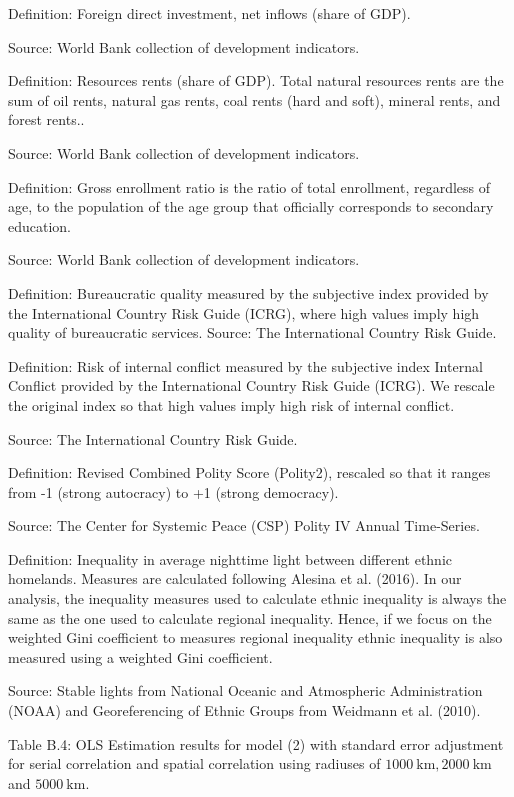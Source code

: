 \documentclass[10pt]{article}
\begin{document}
Definition: Foreign direct investment, net inflows (share of GDP).

Source: World Bank collection of development indicators.

Definition: Resources rents (share of GDP). Total natural resources rents are the sum of oil rents, natural gas rents, coal rents (hard and soft), mineral rents, and forest rents..

Source: World Bank collection of development indicators.

Definition: Gross enrollment ratio is the ratio of total enrollment, regardless of age, to the population of the age group that officially corresponds to secondary education.

Source: World Bank collection of development indicators.

Definition: Bureaucratic quality measured by the subjective index provided by the International Country Risk Guide (ICRG), where high values imply high quality of bureaucratic services. Source: The International Country Risk Guide.

Definition: Risk of internal conflict measured by the subjective index Internal Conflict provided by the International Country Risk Guide (ICRG). We rescale the original index so that high values imply high risk of internal conflict.

Source: The International Country Risk Guide.

Definition: Revised Combined Polity Score (Polity2), rescaled so that it ranges from -1 (strong autocracy) to +1 (strong democracy).

Source: The Center for Systemic Peace (CSP) Polity IV Annual Time-Series.

Definition: Inequality in average nighttime light between different ethnic homelands. Measures are calculated following Alesina et al. (2016). In our analysis, the inequality measures used to calculate ethnic inequality is always the same as the one used to calculate regional inequality. Hence, if we focus on the weighted Gini coefficient to measures regional inequality ethnic inequality is also measured using a weighted Gini coefficient.

Source: Stable lights from National Oceanic and Atmospheric Administration (NOAA) and Georeferencing of Ethnic Groups from Weidmann et al. (2010).

Table B.4: OLS Estimation results for model (2) with standard error adjustment for serial correlation and spatial correlation using radiuses of $1000 \mathrm{~km}, 2000 \mathrm{~km}$ and $5000 \mathrm{~km}$.
\end{document}
